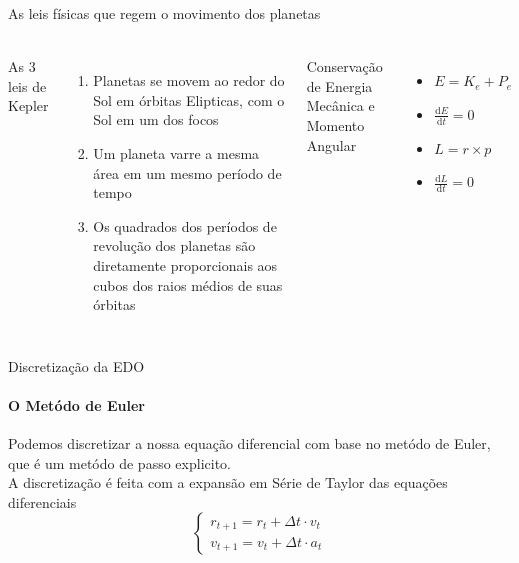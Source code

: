 \documentclass{beamer}
\begin{document}
    \begin{frame}{As leis físicas que regem o movimento dos planetas}
      \framesubtitle{}%
      \begin{columns}[onlytextwidth]
          As 3 leis de Kepler
          \begin{enumerate}
            \item Planetas se movem ao redor do Sol em órbitas Elipticas, com o Sol em um dos focos
            \item Um planeta varre a mesma área em um mesmo período de tempo
            \item Os quadrados dos períodos de revolução dos planetas são diretamente proporcionais aos cubos dos raios médios de suas órbitas
          \end{enumerate}
        Conservação de Energia Mecânica e Momento Angular
        \begin{itemize}
          \item \(E = K_e + P_e\)
          \item \(\frac{\mathrm{d}E}{\mathrm{d}t} = 0 \)
          \item \(L = r \times p\)
          \item \(\frac{\mathrm{d}L}{\mathrm{d}t} = 0 \)
        \end{itemize}
      \end{columns}
    \end{frame}

    \begin{frame}{Discretização da EDO}
      \framesubtitle{O Metódo de Euler}%
      Podemos discretizar a nossa equação diferencial com base no metódo de Euler, que é um metódo de passo explicito.\\
      A discretização é feita com a expansão em Série de Taylor das equações diferenciais
      \[
      \begin{cases}
        r_{t+1} = r_{t} + \Delta t \cdot v_t\\
        v_{t+1} = v_{t} + \Delta t \cdot a_t
      \end{cases}
      \]
    \end{frame}
\end{document}
